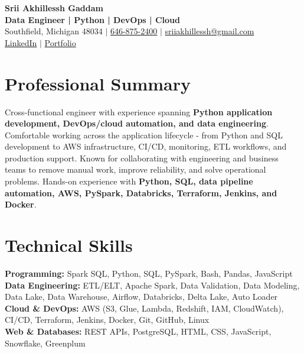 \documentclass[letterpaper,10pt]{article}
\begin{document}
\fontsize{9.35pt}{10.45pt}\selectfont

\begin{center}
    {\LARGE \textbf{Srii Akhillessh Gaddam}} \\[-1pt]
    \textbf{Data Engineer | Python | DevOps | Cloud} \\[2pt]
    Southfield, Michigan 48034 $|$
    \href{tel:6468752400}{646-875-2400} $|$
    \href{mailto:sriiakhillessh@gmail.com}{sriiakhillessh@gmail.com} \\[1pt]
    \href{https://www.linkedin.com/in/srii-akhiilessh-gaddam-b48668191/}{LinkedIn} $|$
    \href{https://sriiakhillesshg.github.io/portfolio/}{Portfolio}
\end{center}
\vspace{-8pt}

\section{Professional Summary}
\small{Cross-functional engineer with experience spanning \textbf{Python application development, DevOps/cloud automation, and data engineering}. Comfortable working across the application lifecycle - from Python and SQL development to AWS infrastructure, CI/CD, monitoring, ETL workflows, and production support. Known for collaborating with engineering and business teams to remove manual work, improve reliability, and solve operational problems. Hands-on experience with \textbf{Python, SQL, data pipeline automation, AWS, PySpark, Databricks, Terraform, Jenkins, and Docker}.}

\section{Technical Skills}
\small{
\textbf{Programming:} Spark SQL, Python, SQL, PySpark, Bash, Pandas, JavaScript \\
\textbf{Data Engineering:} ETL/ELT, Apache Spark, Data Validation, Data Modeling, Data Lake, Data Warehouse, Airflow, Databricks, Delta Lake, Auto Loader \\
\textbf{Cloud \& DevOps:} AWS (S3, Glue, Lambda, Redshift, IAM, CloudWatch), CI/CD, Terraform, Jenkins, Docker, Git, GitHub, Linux \\
\textbf{Web \& Databases:} REST APIs, PostgreSQL, HTML, CSS, JavaScript, Snowflake, Greenplum
}
\end{document}
